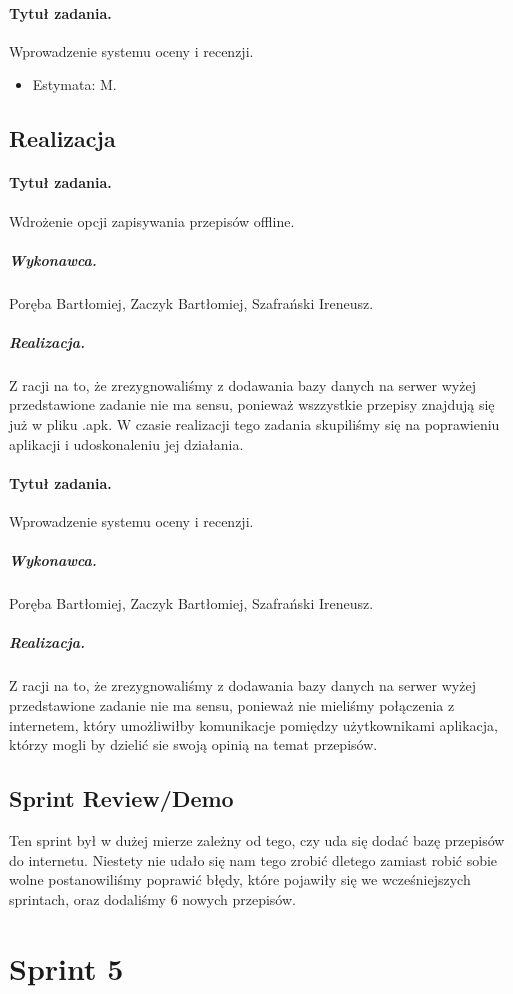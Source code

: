 \documentclass[a4paper]{article}
\begin{document}
	\paragraph{Tytuł zadania.} Wprowadzenie systemu oceny i recenzji.
	\begin{itemize}
		\item Estymata: M.
	\end{itemize}
	
	
	\subsection{Realizacja}
	
	\paragraph{Tytuł zadania.} Wdrożenie opcji zapisywania przepisów offline.
	\subparagraph{Wykonawca.} Poręba Bartłomiej, Zaczyk Bartłomiej, Szafrański Ireneusz.
	\subparagraph{Realizacja.} 
	Z racji na to, że zrezygnowaliśmy z dodawania bazy danych na serwer wyżej przedstawione zadanie nie ma sensu, ponieważ wszzystkie przepisy znajdują się już w pliku .apk. W czasie realizacji tego zadania skupiliśmy się na poprawieniu aplikacji i udoskonaleniu jej działania.
	
	\paragraph{Tytuł zadania.} Wprowadzenie systemu oceny i recenzji.
	\subparagraph{Wykonawca.} Poręba Bartłomiej, Zaczyk Bartłomiej, Szafrański Ireneusz.
	\subparagraph{Realizacja.} 
	Z racji na to, że zrezygnowaliśmy z dodawania bazy danych na serwer wyżej przedstawione zadanie nie ma sensu, ponieważ nie mieliśmy połączenia z internetem, który umożliwiłby komunikacje pomiędzy użytkownikami aplikacja, którzy  mogli by dzielić sie swoją opinią na temat przepisów.
	
	
	
	\subsection{Sprint Review/Demo}
	Ten sprint był w dużej mierze zależny od tego, czy uda się dodać bazę przepisów do internetu. Niestety nie udało się nam tego zrobić dletego zamiast robić sobie wolne postanowiliśmy poprawić błędy, które pojawiły się we wcześniejszych sprintach, oraz dodaliśmy 6 nowych przepisów.
	
	\section{Sprint 5}
	
\end{document}

